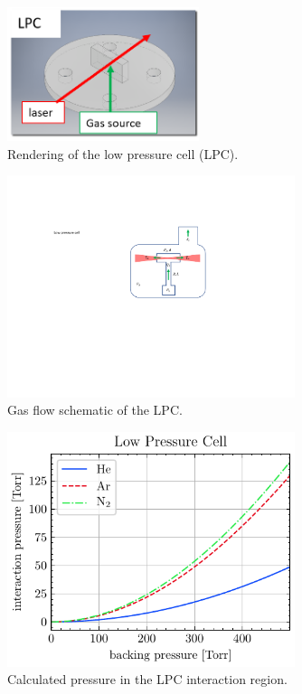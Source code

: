\begin{figure}
	\centering
	\includegraphics[width=0.5\textwidth]{figures/chap3/LPC_diagram.png}
	\caption{Rendering of the low pressure cell (LPC).}
	\label{fig:LPC_diagram}
\end{figure}

\begin{figure}
	\centering
	\includegraphics[width=0.75\textwidth]{figures/chap3/LPC_schematic.pdf}
	\caption{Gas flow schematic of the LPC.}
	\label{fig:LPC_schematic}
\end{figure}

\begin{figure}
	\centering
	\includegraphics[width=0.75\textwidth]{figures/chap3/LPC_interaction_p.pdf}
	\caption{Calculated pressure in the LPC interaction region.}
	\label{fig:LPC_interaction_p}
\end{figure}

